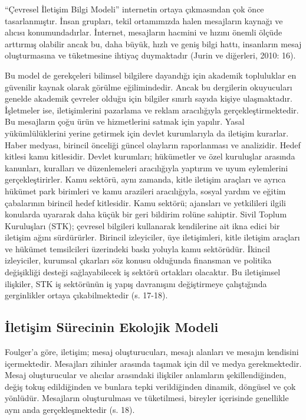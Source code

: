 \documentclass[
]{book}
\begin{document}
``Çevresel İletişim Bilgi Modeli'' internetin ortaya çıkmasından çok önce tasarlanmıştır. İnsan grupları, tekil ortamımızda halen mesajların kaynağı ve alıcısı konumundadırlar. İnternet, mesajların hacmini ve hızını önemli ölçüde arttırmış olabilir ancak bu, daha büyük, hızlı ve geniş bilgi hattı, insanların mesaj oluşturmasına ve tüketmesine ihtiyaç duymaktadır (Jurin ve diğerleri, 2010: 16).

Bu model de gerekçeleri bilimsel bilgilere dayandığı için akademik topluluklar en güvenilir kaynak olarak görülme eğilimindedir. Ancak bu dergilerin okuyucuları genelde akademik çevreler olduğu için bilgiler sınırlı sayıda kişiye ulaşmaktadır. İşletmeler ise, iletişimlerini pazarlama ve reklam aracılığıyla gerçekleştirmektedir. Bu mesajların çoğu ürün ve hizmetlerini satmak için yapılır. Yasal yükümlülüklerini yerine getirmek için devlet kurumlarıyla da iletişim kurarlar. Haber medyası, birincil önceliği güncel olayların raporlanması ve analizidir. Hedef kitlesi kamu kitlesidir. Devlet kurumları; hükümetler ve özel kuruluşlar arasında kanunları, kuralları ve düzenlemeleri aracılığıyla yaptırım ve uyum eylemlerini gerçekleştirirler. Kamu sektörü, aynı zamanda, kitle iletişim araçları ve ayrıca hükümet park birimleri ve kamu arazileri aracılığıyla, sosyal yardım ve eğitim çabalarının birincil hedef kitlesidir. Kamu sektörü; ajansları ve yetkilileri ilgili konularda uyararak daha küçük bir geri bildirim rolüne sahiptir. Sivil Toplum Kuruluşları (STK); çevresel bilgileri kullanarak kendilerine ait ikna edici bir iletişim ağını sürdürürler. Birincil izleyiciler, üye iletişimleri, kitle iletişim araçları ve hükümet temsilcileri üzerindeki baskı yoluyla kamu sektörüdür. İkincil izleyiciler, kurumsal çıkarları söz konusu olduğunda finansman ve politika değişikliği desteği sağlayabilecek iş sektörü ortakları olacaktır. Bu iletişimsel ilişkiler, STK iş sektörünün iş yapış davranışını değiştirmeye çalıştığında gerginlikler ortaya çıkabilmektedir (s. 17-18). \citep{jurin2010environmental}

\hypertarget{iletiux15fim-suxfcrecinin-ekolojik-modeli}{%
\subsection{İletişim Sürecinin Ekolojik Modeli}\label{iletiux15fim-suxfcrecinin-ekolojik-modeli}}

Foulger'a göre, iletişim; mesaj oluşturucuları, mesajı alanları ve mesajın kendisini içermektedir. Mesajları zihinler arasında taşımak için dil ve medya gerekmektedir. Mesaj oluşturucular ve alıcılar arasındaki ilişkiler anlamların şekillendiğinden, değiş tokuş edildiğinden ve bunlara tepki verildiğinden dinamik, döngüsel ve çok yönlüdür. Mesajların oluşturulması ve tüketilmesi, bireyler içerisinde genellikle aynı anda gerçekleşmektedir (s. 18). \citep{jurin2010environmental}
\end{document}
